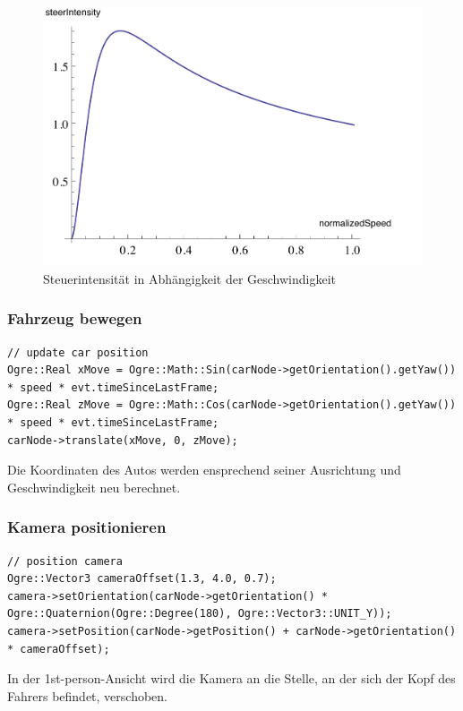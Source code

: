 \begin{figure}[H]
\centering 
\includegraphics[width=0.7\linewidth]{src/steerIntensity.pdf}
\caption{Steuerintensität in Abhängigkeit der Geschwindigkeit} %
\label{steer_intensity} %
\end{figure}

\subsubsection*{Fahrzeug bewegen}
\begin{lstlisting}[caption={Fahrzeug bewegen},label={fahrzeug_bewegen}]
// update car position
Ogre::Real xMove = Ogre::Math::Sin(carNode->getOrientation().getYaw()) * speed * evt.timeSinceLastFrame;
Ogre::Real zMove = Ogre::Math::Cos(carNode->getOrientation().getYaw()) * speed * evt.timeSinceLastFrame;
carNode->translate(xMove, 0, zMove);
\end{lstlisting}

Die Koordinaten des Autos werden ensprechend seiner Ausrichtung und Geschwindigkeit neu berechnet.

\subsubsection*{Kamera positionieren}
\begin{lstlisting}[caption={Positionierung der 1st-Person-Kamera},label={positionierung_fp_kamera}]
// position camera
Ogre::Vector3 cameraOffset(1.3, 4.0, 0.7);
camera->setOrientation(carNode->getOrientation() * Ogre::Quaternion(Ogre::Degree(180), Ogre::Vector3::UNIT_Y));
camera->setPosition(carNode->getPosition() + carNode->getOrientation() * cameraOffset);
\end{lstlisting}
In der \gls{1st-person}-Ansicht wird die Kamera an die Stelle, an der sich der Kopf des Fahrers befindet, verschoben.\\

